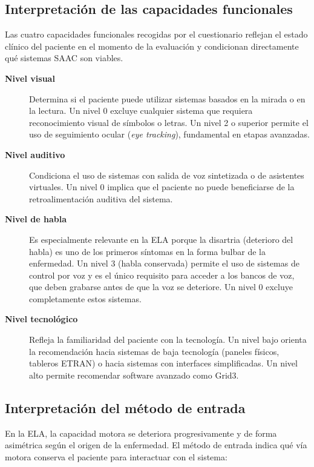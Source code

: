 \subsection{Interpretación de las capacidades funcionales}
Las cuatro capacidades funcionales recogidas por el cuestionario reflejan el estado clínico del paciente en el momento de la evaluación y condicionan directamente qué sistemas SAAC son viables.

\begin{description}
	\item[\textbf{Nivel visual}] Determina si el paciente puede utilizar sistemas basados en la mirada o en la lectura. Un nivel 0 excluye cualquier sistema que requiera reconocimiento visual de símbolos o letras. Un nivel 2 o superior permite el uso de seguimiento ocular (\textit{eye 			tracking}), fundamental en etapas avanzadas.
	\item[\textbf{Nivel auditivo}] Condiciona el uso de sistemas con salida de voz sintetizada o de asistentes virtuales. Un nivel 0 implica que el paciente no puede beneficiarse de la retroalimentación auditiva del sistema.
	\item[\textbf{Nivel de habla}] Es especialmente relevante en la ELA porque la disartria (deterioro del habla) es uno de los primeros síntomas en la forma bulbar de la enfermedad. Un nivel 3 (habla conservada) permite el uso de sistemas de control por voz y es el único requisito para 	acceder a los bancos de voz, que deben grabarse antes de que la voz se deteriore. Un nivel 0 excluye completamente estos sistemas.
	\item[\textbf{Nivel tecnológico}] Refleja la familiaridad del paciente con la tecnología. Un nivel bajo orienta la recomendación hacia sistemas de baja tecnología (paneles físicos, tableros ETRAN) o hacia sistemas con interfaces simplificadas. Un nivel alto permite recomendar software 	avanzado como Grid3.
\end{description}

\subsection{Interpretación del método de entrada}
En la ELA, la capacidad motora se deteriora progresivamente y de forma asimétrica según el origen de la enfermedad. El método de entrada indica qué vía motora conserva el paciente para interactuar con el sistema:

